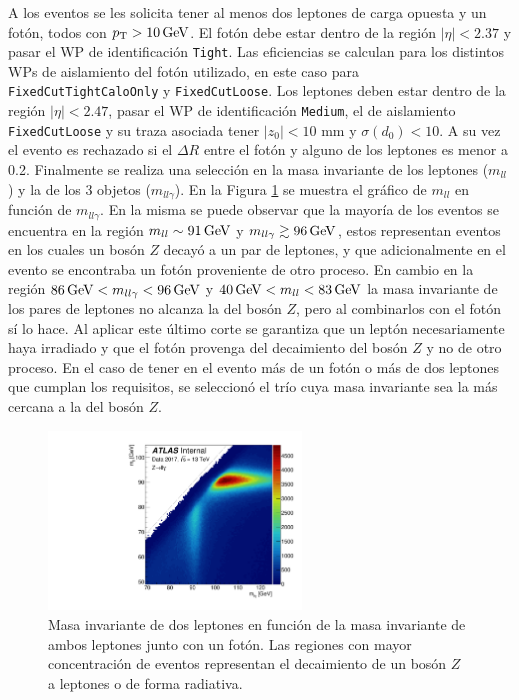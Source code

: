 

A los eventos se les solicita tener al menos dos leptones de carga opuesta y un fotón, todos con $p_{\text{T}}>10\,\text{GeV}$. El fotón debe estar dentro de la región $|\eta| < 2.37$ y pasar el WP de identificación \texttt{Tight}. Las eficiencias se calculan para los distintos WPs de aislamiento del fotón utilizado, en este caso para \texttt{FixedCutTightCaloOnly} y \texttt{FixedCutLoose}. Los leptones deben estar dentro de la región $|\eta| < 2.47$, pasar el WP de identificación \texttt{Medium}, el de aislamiento \texttt{FixedCutLoose} y su traza asociada tener $|z_0| < 10$ mm y $\sigma(d_0) < 10$. A su vez el evento es rechazado si el $\Delta R$ entre el fotón y alguno de los leptones es menor a 0.2. Finalmente se realiza una selección en la masa invariante de los leptones ($m_{ll}$) y la de los 3 objetos ($m_{ll\gamma}$). En la Figura \ref{mllgmll} se muestra el gráfico de $m_{ll}$ en función de $m_{ll\gamma}$. En la misma se puede observar que la mayoría de los eventos se encuentra en la región $m_{ll}\sim91\,\text{GeV}$ y $m_{ll\gamma}\gtrsim96\,\text{GeV}$, estos representan eventos en los cuales un bosón $Z$ decayó a un par de leptones, y que adicionalmente en el evento se encontraba un fotón proveniente de otro proceso. En cambio en la región $86\,\text{GeV}<m_{ll\gamma}<96\,\text{GeV}$ y $40\,\text{GeV}<m_{ll}<83\,\text{GeV}$ la masa invariante de los pares de leptones no alcanza la del bosón $Z$, pero al combinarlos con el fotón sí lo hace. Al aplicar este último corte se garantiza que un leptón necesariamente haya irradiado y que el fotón provenga del decaimiento del bosón $Z$ y no de otro proceso. En el caso de tener en el evento más de un fotón o más de dos leptones que cumplan los requisitos, se seleccionó el trío cuya masa invariante sea la más cercana a la del bosón $Z$.

\begin{figure}
  \centering
  \includegraphics[width=0.6\textwidth]{images/trigger/h_mllg_mll.pdf}
	\caption{Masa invariante de dos leptones en función de la masa invariante de ambos leptones junto con un fotón. Las regiones con mayor concentración de eventos representan el decaimiento de un bosón $Z$ a leptones o de forma radiativa.}
  \label{mllgmll}
\end{figure}

